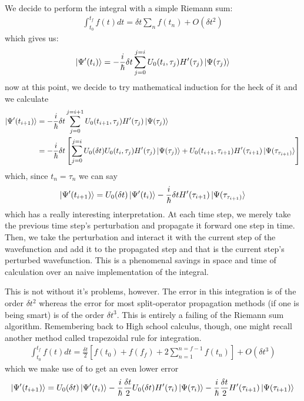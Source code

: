 We decide to perform the integral with a simple Riemann sum:
\begin{align*}
	\int_{t_0}^{t_f} f(t) dt =\delta t \sum_{n} f(t_n) + O(\delta t^2)
\end{align*}
which gives us:
\begin{align*}
	\ket{\Psi'(t_i)} = -\frac{i}{\hbar} \delta t  \sum_{j=0}^{j=i}   U_0 (t_i, \tau_j) H'(\tau_j) \ket{\Psi (\tau_j)}
\end{align*}
now at this point, we decide to try mathematical induction for the heck of it and we calculate
\begin{align*}
	\ket{\Psi'(t_{i+1})} &= -\frac{i}{\hbar} \delta t  \sum_{j=0}^{j=i+1}   U_0 (t_{i+1}, \tau_j) H'(\tau_j) \ket{\Psi (\tau_j)} \\
									&= -\frac{i}{\hbar} \delta t \left[ \sum_{j=0}^{j=i}   U_0 (\delta t) U_0 (t_{i}, \tau_j) H'(\tau_j) \ket{\Psi (\tau_j)}  + U_0 (t_{i+1}, \tau_{i+1}) H'(\tau_{i+1}) \ket{\Psi (\tau_{\tau_{i+1})}} \right]
\end{align*}
which, since $t_n = \tau_n $ we can say
\begin{align*}
	\ket{\Psi'(t_{i+1})} = U_0 (\delta t)\ket{\Psi'(t_i)} -\frac{i}{\hbar} \delta t H'(\tau_{i+1}) \ket{\Psi (\tau_{\tau_{i+1})}}
\end{align*}
which has a really interesting interpretation.  At each time step, we merely take the previous time step's perturbation and propagate it forward one step in time.  Then, we take the perturbation and interact it with the current step of the wavefunction and add it to the propagated step and that is the current step's perturbed wavefunction.  This is a phenomenal savings in space and time of calculation over an naive implementation of the integral.

This is not without it's problems, however.  The error in this integration is of the order $\delta t^2$ whereas the error for most split-operator propagation methods (if one is being smart) is of the order $\delta t^3$.  This is entirely a failing of the Riemann sum algorithm.  Remembering back to High school calculus, though, one might recall another method called trapezoidal rule for integration.
\begin{align*}
	\int_{t_0}^{t_f} f(t) dt =\frac{\delta t}{2} \left[ f(t_0) + f(f_f) + 2  \sum_{n=1}^{n=f-1} f(t_n) \right] + O(\delta t^3)
\end{align*}
which we make use of to get an even lower error
\begin{align*}
	\ket{\Psi'(t_{i+1})} = U_0 (\delta t)\ket{\Psi'(t_{i})} -\frac{i}{\hbar}  \frac{\delta t}{2} U_0 (\delta t) H'(\tau_{i}) \ket{\Psi (\tau_{i})} -\frac{i}{\hbar} \frac{\delta t}{2} H'(\tau_{i+1}) \ket{\Psi (\tau_{i+1})}
\end{align*}

